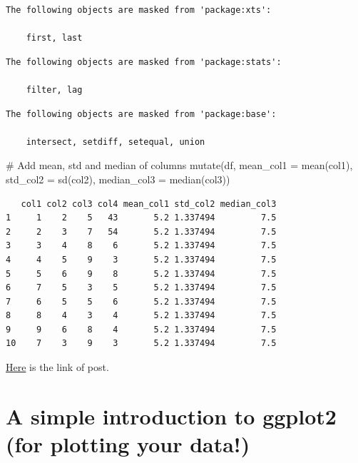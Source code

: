 \documentclass[
  letterpaper,
  DIV=11,
  numbers=noendperiod]{scrreprt}
\newenvironment{Shaded}{\begin{snugshade}}{\end{snugshade}}
\newcommand{\AttributeTok}[1]{\textcolor[rgb]{0.40,0.45,0.13}{#1}}
\newcommand{\CommentTok}[1]{\textcolor[rgb]{0.37,0.37,0.37}{#1}}
\newcommand{\FunctionTok}[1]{\textcolor[rgb]{0.28,0.35,0.67}{#1}}
\newcommand{\NormalTok}[1]{\textcolor[rgb]{0.00,0.23,0.31}{#1}}
\begin{document}
\begin{verbatim}
The following objects are masked from 'package:xts':

    first, last
\end{verbatim}

\begin{verbatim}
The following objects are masked from 'package:stats':

    filter, lag
\end{verbatim}

\begin{verbatim}
The following objects are masked from 'package:base':

    intersect, setdiff, setequal, union
\end{verbatim}

\begin{Shaded}
\begin{Highlighting}[]
\CommentTok{\# Add mean, std and median of columns}
\FunctionTok{mutate}\NormalTok{(df, }\AttributeTok{mean\_col1 =} \FunctionTok{mean}\NormalTok{(col1),}
       \AttributeTok{std\_col2 =} \FunctionTok{sd}\NormalTok{(col2), }
       \AttributeTok{median\_col3 =} \FunctionTok{median}\NormalTok{(col3))}
\end{Highlighting}
\end{Shaded}

\begin{verbatim}
   col1 col2 col3 col4 mean_col1 std_col2 median_col3
1     1    2    5   43       5.2 1.337494         7.5
2     2    3    7   54       5.2 1.337494         7.5
3     3    4    8    6       5.2 1.337494         7.5
4     4    5    9    3       5.2 1.337494         7.5
5     5    6    9    8       5.2 1.337494         7.5
6     7    5    3    5       5.2 1.337494         7.5
7     6    5    5    6       5.2 1.337494         7.5
8     8    4    3    4       5.2 1.337494         7.5
9     9    6    8    4       5.2 1.337494         7.5
10    7    3    9    3       5.2 1.337494         7.5
\end{verbatim}

\href{https://towardsdatascience.com/the-power-of-mutate-for-data-wrangling-in-r-172dd2b0be73}{Here}
is the link of post.

\hypertarget{a-simple-introduction-to-ggplot2-for-plotting-your-data}{%
\section{A simple introduction to ggplot2 (for plotting your
data!)}\label{a-simple-introduction-to-ggplot2-for-plotting-your-data}}
\end{document}
